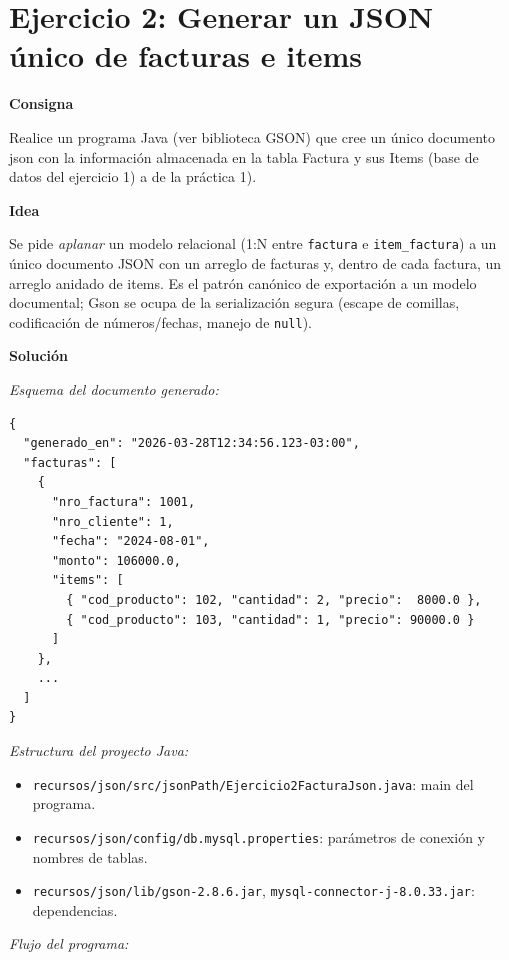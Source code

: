 \documentclass[11pt,a4paper]{article}
\newcommand{\itemcabecera}[1]{\noindent\textbf{#1}\par\medskip}
\newcommand{\bloqueConsigna}{\itemcabecera{Consigna}}
\newcommand{\bloqueIdea}{\itemcabecera{Idea}}
\newcommand{\bloqueSolucion}{\itemcabecera{Soluci\'on}}
\begin{document}
\section{Ejercicio 2: Generar un JSON único de facturas e items}

\bloqueConsigna

Realice un programa Java (ver biblioteca GSON) que cree un único documento json con la información almacenada en la tabla Factura y sus Items (base de datos del ejercicio 1) a de la práctica 1).

\bloqueIdea

Se pide \emph{aplanar} un modelo relacional (1:N entre \texttt{factura} e \texttt{item\_factura}) a un único documento JSON con un arreglo de facturas y, dentro de cada factura, un arreglo anidado de items. Es el patrón canónico de exportación a un modelo documental; Gson se ocupa de la serialización segura (escape de comillas, codificación de números/fechas, manejo de \texttt{null}).

\bloqueSolucion

\textit{Esquema del documento generado:}

\begin{lstlisting}[style=plain]
{
  "generado_en": "2026-03-28T12:34:56.123-03:00",
  "facturas": [
    {
      "nro_factura": 1001,
      "nro_cliente": 1,
      "fecha": "2024-08-01",
      "monto": 106000.0,
      "items": [
        { "cod_producto": 102, "cantidad": 2, "precio":  8000.0 },
        { "cod_producto": 103, "cantidad": 1, "precio": 90000.0 }
      ]
    },
    ...
  ]
}
\end{lstlisting}

\textit{Estructura del proyecto Java:}

\begin{itemize}
    \item \texttt{recursos/json/src/jsonPath/Ejercicio2FacturaJson.java}: main del programa.
    \item \texttt{recursos/json/config/db.mysql.properties}: parámetros de conexión y nombres de tablas.
    \item \texttt{recursos/json/lib/gson-2.8.6.jar}, \texttt{mysql-connector-j-8.0.33.jar}: dependencias.
\end{itemize}

\textit{Flujo del programa:}
\end{document}
